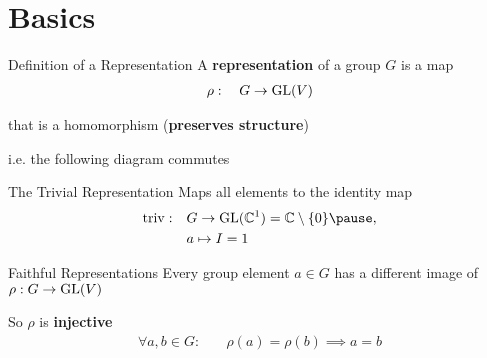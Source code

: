 
\section{Basics}

\begin{frame}{Definition of a Representation}
    \large
    A \textbf{representation} of a group $G$ is a map
    \Large
    \pause
    \begin{align*}
        \rho: \quad G \to \operatorname{GL}(V)
    \end{align*}
    
    \normalsize
    \pause
    that is a homomorphism (\textbf{preserves structure})

    \pause
    i.e. the following diagram commutes
    \begin{figure}
        \centering
    \end{figure}
    {\hspace*{\fill} \cite{hein2013}}

\end{frame}

\begin{frame}{The Trivial Representation}
    \large
    Maps all elements to the identity map
    \Large
        \pause
    \begin{align*}
        \triv: \quad & G \to \GL(\C^1) = \C \setminus \{0\} \pause , \\
        & a \mapsto I = 1
    \end{align*}
    
    \normalsize
    {\hspace*{\fill} \cite{hein2013}}
\end{frame}

\begin{frame}{Faithful Representations}
    \large
    Every group element $a \in G$ has a different image of $\rho: G \to \operatorname{GL}(V)$

    \pause
    So $\rho$ is \textbf{injective}
    \Large
    \pause
    \begin{align*}
        \forall a, b \in G: \quad & \rho(a) = \rho(b) \implies a = b
    \end{align*}
    \normalsize
    {\hspace*{\fill} \cite{hein2013}}
\end{frame}

